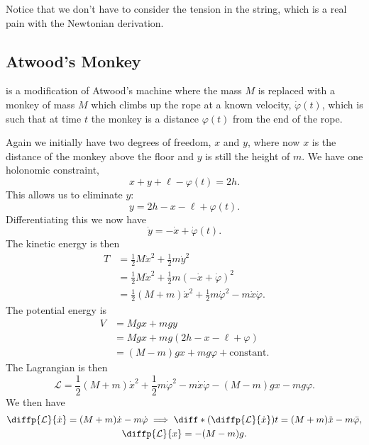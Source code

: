 \documentclass[fleqn]{NotesClass}
\newcommand*{\lagrangian}{\mathcal{L}}
\begin{document}
    Notice that we don't have to consider the tension in the string, which is a real pain with the Newtonian derivation.
    
    \subsection{Atwood's Monkey}
     is a modification of Atwood's machine where the mass \(M\) is replaced with a monkey of mass \(M\) which climbs up the rope at a known velocity, \(\dot{\varphi}(t)\), which is such that at time \(t\) the monkey is a distance \(\varphi(t)\) from the end of the rope.
    
    Again we initially have two degrees of freedom, \(x\) and \(y\), where now \(x\) is the distance of the monkey above the floor and \(y\) is still the height of \(m\).
    We have one holonomic constraint,
    \begin{equation}
        x + y + \ell - \varphi(t) = 2h.
    \end{equation}
    This allows us to eliminate \(y\):
    \begin{equation}
        y = 2h - x - \ell + \varphi(t).
    \end{equation}
    Differentiating this we now have
    \begin{equation}
        \dot{y} = -\dot{x} + \dot{\varphi}(t).
    \end{equation}
    The kinetic energy is then
    \begin{align}
        T &= \frac{1}{2}M\dot{x}^2 + \frac{1}{2}m\dot{y}^2\\
        &= \frac{1}{2}M\dot{x}^2 + \frac{1}{2}m(-\dot{x} + \dot{\varphi})^2\\
        &= \frac{1}{2}(M + m)\dot{x}^2 + \frac{1}{2}m\dot{\varphi}^2 - m\dot{x}\dot{\varphi}.
    \end{align}
    The potential energy is
    \begin{align}
        V &= Mgx + mgy\\
        &= Mgx + mg(2h - x - \ell + \varphi)\\
        &= (M - m)gx + mg\varphi + \text{constant}.
    \end{align}
    The Lagrangian is then
    \begin{equation}
        \lagrangian = \frac{1}{2}(M + m)\dot{x}^2 + \frac{1}{2}m\dot{\varphi}^2 - m\dot{x}\dot{\varphi} - (M - m)gx - mg\varphi.
    \end{equation}
    We then have
    \begin{gather}
        \diffp{\lagrangian}{\dot{x}} = (M + m)\dot{x} - m\dot{\varphi} \implies \diff*{\left( \diffp{\lagrangian}{\dot{x}} \right)}{t} = (M + m)\ddot{x} - m\ddot{\varphi},\\
        \diffp{\lagrangian}{x} = -(M - m)g.
    \end{gather}
\end{document}
